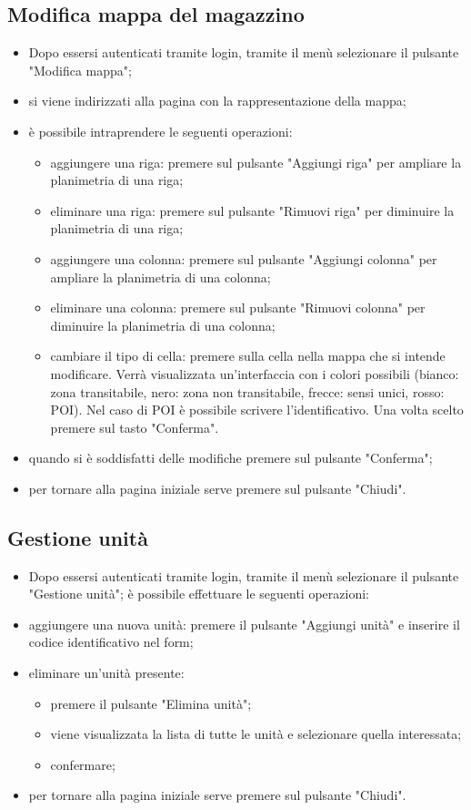 \subsection{Modifica mappa del magazzino}
\begin{itemize}
    \item Dopo essersi autenticati tramite login, tramite il menù selezionare il pulsante "Modifica mappa";
    \item si viene indirizzati alla pagina con la rappresentazione della mappa;
    \item è possibile intraprendere le seguenti operazioni:
        \begin{itemize}
            \item aggiungere una riga: premere sul pulsante "Aggiungi riga" per ampliare la planimetria di una riga;
            \item eliminare una riga: premere sul pulsante "Rimuovi riga" per diminuire la planimetria di una riga;
            \item aggiungere una colonna: premere sul pulsante "Aggiungi colonna" per ampliare la planimetria di una colonna;
            \item eliminare una colonna: premere sul pulsante "Rimuovi colonna" per diminuire la planimetria di una colonna;
            \item cambiare il tipo di cella: premere sulla cella nella mappa che si intende modificare. Verrà visualizzata un'interfaccia con i colori possibili (bianco: zona transitabile, nero: zona non transitabile, frecce: sensi unici, rosso: POI). Nel caso di POI è possibile scrivere l'identificativo. Una volta scelto premere sul tasto "Conferma".
        \end{itemize}
    \item quando si è soddisfatti delle modifiche premere sul pulsante "Conferma";
    \item per tornare alla pagina iniziale serve premere sul pulsante "Chiudi".
\end{itemize}

\subsection{Gestione unità}
\begin{itemize}
\item Dopo essersi autenticati tramite login, tramite il menù selezionare il pulsante "Gestione unità"; è possibile effettuare le seguenti operazioni:
    \item aggiungere una nuova unità: premere il pulsante "Aggiungi unità" e inserire il codice identificativo nel form;
    \item eliminare un'unità presente: 
    \begin{itemize}
        \item premere il pulsante "Elimina unità";
        \item viene visualizzata la lista di tutte le unità e selezionare quella interessata;
        \item confermare;
    \end{itemize}
    \item per tornare alla pagina iniziale serve premere sul pulsante "Chiudi".
\end{itemize}